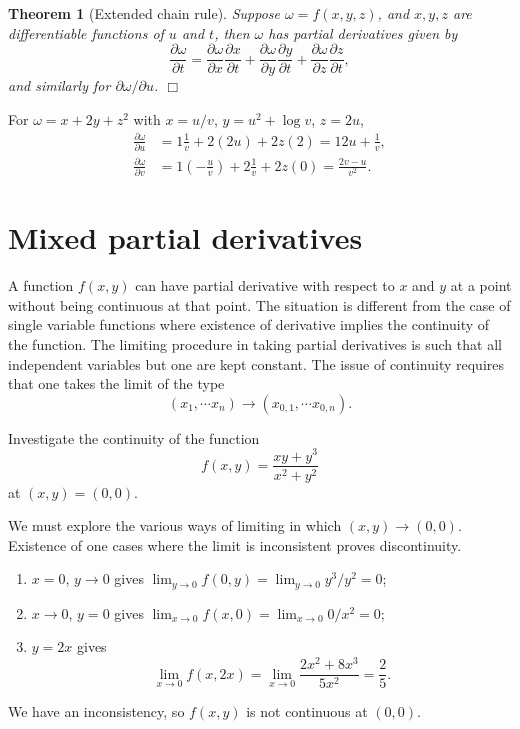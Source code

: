 \documentclass[letter-paper]{tufte-book}
\newtheorem{theorem}{\color{pastel-blue}Theorem}[section]
\newenvironment{example}[1][Example]{\begin{trivlist}
\item[\hskip \labelsep {\bfseries #1}]}{\end{trivlist}}
\newcommand{\dy}{\partial}
\newcommand{\ddy}[2]{\frac{\dy#1}{\dy#2}}
\newcommand{\qedwhite}{\hfill \ensuremath{\Box}}
\begin{document}
\begin{theorem}[Extended chain rule]
  Suppose $\omega=f(x,y,z)$, and $x,y,z$ are differentiable functions of $u$ and
  $t$, then $\omega$ has partial derivatives given by
  \begin{equation*}
    \ddy{\omega}{t}=\ddy{\omega}{x}\ddy{x}{t}+
    \ddy{\omega}{y}\ddy{y}{t}+\ddy{\omega}{z}\ddy{z}{t},
  \end{equation*}
  and similarly for $\dy\omega/\dy u$. \qedwhite
\end{theorem}
\begin{example}
  For $\omega=x+2y+z^2$ with $x=u/v$, $y=u^2+\log v$, $z=2u$,
  \begin{align*}
    \ddy{\omega}{u} &= 1\frac{1}{v}+2(2u)+2z(2)=12u+\frac{1}{v}, \\
    \ddy{\omega}{v} &= 1\left(-\frac{u}{v}\right)+2\frac{1}{v}+2z(0)=
    \frac{2v-u}{v^2}.
  \end{align*}
\end{example}


\section{Mixed partial derivatives}

A function $f(x,y)$ can have partial derivative with respect to $x$ and $y$ at a
point without being continuous at that point. The situation is different from
the case of single variable functions where existence of derivative implies the
continuity of the function. The limiting procedure in taking partial derivatives
is such that all independent variables but one are kept constant. The issue of
continuity requires that one takes the limit of the type
\begin{equation*}
  (x_1,\cdots x_n)\to(x_{0,1},\cdots x_{0,n}).
\end{equation*}
\begin{example}
  Investigate the continuity of the function
  \begin{equation*}
    f(x,y)=\frac{xy+y^3}{x^2+y^2}
  \end{equation*}
  at $(x,y)=(0,0)$.
  
  We must explore the various ways of limiting in which $(x,y)\to(0,0)$.
  Existence of one cases where the limit is inconsistent proves discontinuity.
  \begin{enumerate}
    \item $x=0$, $y\to0$ gives $\lim_{y\to 0} f(0,y)=\lim_{y\to 0} y^3/y^2=0$;
    \item $x\to0$, $y=0$ gives $\lim_{x\to 0} f(x,0)=\lim_{x\to 0} 0/x^2=0$;
    \item $y=2x$ gives
    \begin{equation*}
      \lim_{x\to 0}f(x,2x)=\lim_{x\to 0}\frac{2x^2+8x^3}{5x^2}=\frac{2}{5}.
    \end{equation*}
  \end{enumerate}
  We have an inconsistency, so $f(x,y)$ is not continuous at $(0,0)$.
\end{example}
\end{document}

